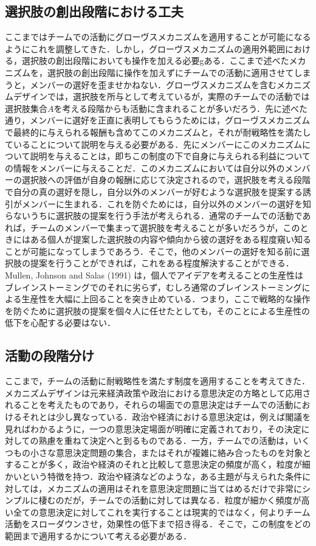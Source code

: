 \documentclass[a4paper, 11pt]{jsarticle}
\begin{document}
\subsection{選択肢の創出段階における工夫}
ここまではチームでの活動にグローヴスメカニズムを適用することが可能になるようにこれを調整してきた．しかし，グローヴスメカニズムの適用外範囲における，選択肢の創出段階においても操作を加える必要gある．ここまで述べたメカニズムを，選択肢の創出段階に操作を加えずにチームでの活動に適用させてしまうと，メンバーの選好を歪ませかねない．グローヴスメカニズムを含むメカニズムデザインでは，選択肢を所与として考えているが，実際のチームでの活動では選択肢集合\(A\)を考える段階からも活動に含まれることが多いだろう．先に述べた通り，メンバーに選好を正直に表明してもらうためには，グローヴスメカニズムで最終的に与えられる報酬も含めてこのメカニズムと，それが耐戦略性を満たしていることについて説明を与える必要がある．先にメンバーにこのメカニズムについて説明を与えることは，即ちこの制度の下で自身に与えられる利益についての情報をメンバーに与えることだ．このメカニズムにおいては自分以外のメンバーの選択肢への評価が自身の報酬に応じて決定されるので，選択肢を考える段階で自分の真の選好を隠し，自分以外のメンバーが好むような選択肢を提案する誘引がメンバーに生まれる．これを防ぐためには，自分以外のメンバーの選好を知らないうちに選択肢の提案を行う手法が考えられる．通常のチームでの活動であれば，チームのメンバーで集まって選択肢を考えることが多いだろうが，このときにはある個人が提案した選択肢の内容や傾向から彼の選好をある程度窺い知ることが可能になってしまうであろう．そこで，他のメンバーの選好を知る前に選択肢の提案を行うことができれば，これをある程度解決することができる．Mullen, Johnson and Salas (1991) \cite{Mullen}は，個人でアイデアを考えることの生産性はブレインストーミングでのそれに劣らず，むしろ通常のブレインストーミングによる生産性を大幅に上回ることを突き止めている．つまり，ここで戦略的な操作を防ぐために選択肢の提案を個々人に任せたとしても，そのことによる生産性の低下を心配する必要はない．

\subsection{活動の段階分け}
ここまで，チームの活動に耐戦略性を満たす制度を適用することを考えてきた．メカニズムデザインは元来経済政策や政治における意思決定の方略として応用されることを考えたものであり，それらの場面での意思決定はチームでの活動におけるそれとは少し異なっている．政治や経済における意思決定は，例えば閣議を見ればわかるように，一つの意思決定場面が明確に定義されており，その決定に対しての熟慮を重ねて決定へと到るものである．一方，チームでの活動は，いくつもの小さな意思決定問題の集合，またはそれが複雑に絡み合ったものを対象とすることが多く，政治や経済のそれと比較して意思決定の頻度が高く，粒度が細かいという特徴を持つ．政治や経済などのような，ある主題が与えられた条件に対しては，メカニズムの適用はそれを意思決定問題に当てはめるだけで非常にシンプルに棲むのだが，チームでの活動に対しては異なる．粒度が細かく頻度が高い全ての意思決定に対してこれを実行することは現実的ではなく，何よりチーム活動をスローダウンさせ，効果性の低下まで招き得る．そこで，この制度をどの範囲まで適用するかについて考える必要がある．
\end{document}
